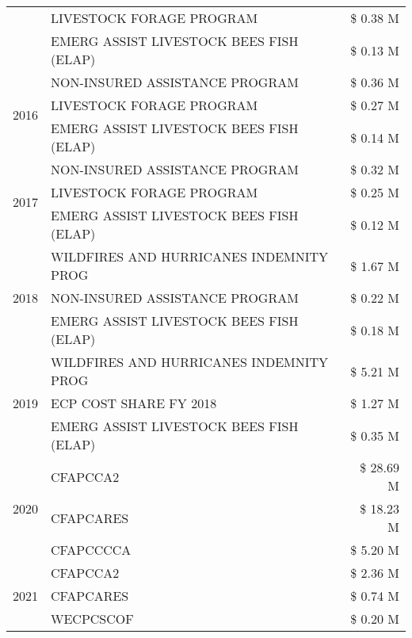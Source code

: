 \begin{tabular}{llr}
 & LIVESTOCK FORAGE PROGRAM & \$ 0.38 M \\
 & EMERG ASSIST LIVESTOCK BEES FISH (ELAP) & \$ 0.13 M \\
\cline{1-3}
\multirow[t]{3}{*}{2016} & NON-INSURED ASSISTANCE PROGRAM                & \$ 0.36 M \\
 & LIVESTOCK FORAGE PROGRAM                      & \$ 0.27 M \\
 & EMERG ASSIST LIVESTOCK BEES FISH (ELAP)       & \$ 0.14 M \\
\cline{1-3}
\multirow[t]{3}{*}{2017} & NON-INSURED ASSISTANCE PROGRAM & \$ 0.32 M \\
 & LIVESTOCK FORAGE PROGRAM & \$ 0.25 M \\
 & EMERG ASSIST LIVESTOCK BEES FISH (ELAP) & \$ 0.12 M \\
\cline{1-3}
\multirow[t]{3}{*}{2018} & WILDFIRES AND HURRICANES INDEMNITY PROG & \$ 1.67 M \\
 & NON-INSURED ASSISTANCE PROGRAM & \$ 0.22 M \\
 & EMERG ASSIST LIVESTOCK BEES FISH (ELAP) & \$ 0.18 M \\
\cline{1-3}
\multirow[t]{3}{*}{2019} & WILDFIRES AND HURRICANES INDEMNITY PROG & \$ 5.21 M \\
 & ECP COST SHARE FY 2018 & \$ 1.27 M \\
 & EMERG ASSIST LIVESTOCK BEES FISH (ELAP) & \$ 0.35 M \\
\cline{1-3}
\multirow[t]{3}{*}{2020} & CFAPCCA2 & \$ 28.69 M \\
 & CFAPCARES & \$ 18.23 M \\
 & CFAPCCCCA & \$ 5.20 M \\
\cline{1-3}
\multirow[t]{3}{*}{2021} & CFAPCCA2 & \$ 2.36 M \\
 & CFAPCARES & \$ 0.74 M \\
 & WECPCSCOF & \$ 0.20 M \\
\cline{1-3}
\bottomrule
\end{tabular}
